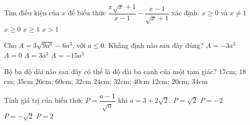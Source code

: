 \begin{ex}%
	Tìm điều kiện của $x$ để biểu thức $\dfrac{x\sqrt{x}+1}{x-1}-\dfrac{x-1}{\sqrt{x}+1}$ xác định.
	\choice
		{\True $x \geq 0$ và $x \neq 1$}
		{$x \geq 0$}
		{$x \geq 1$}
		{$x > 1$}
\end{ex}
\begin{ex}%
	Cho $A=3\sqrt{9a^6}-6a^3$, với $a \leq 0$. Khẳng định nào sau đây đúng?
	\choice
		{$A=-3a^3$}
		{$A=0$}
		{$A=3a^3$}
		{\True $A=-15a^3$}
\end{ex}
\begin{ex}%
	Bộ ba độ dài nào sau đây có thể là độ dài ba cạnh của một tam giác?
	\choice
		{$17$cm; $18$cm; $35$cm}
		{$26$cm; $60$cm; $32$cm}
		{\True $24$cm; $32$cm; $40$cm}
		{$12$cm; $20$cm; $34$cm}
\end{ex}
\begin{ex}%
	Tính giá trị của biểu thức $P=\dfrac{a-1}{\sqrt{a}}$ khi $a=3+2\sqrt{2}$.
	\choice
		{$P=\sqrt{2}$}
		{$P=-2$}
		{$P=-\sqrt{2}$}
		{\True $P=2$}
\end{ex}
